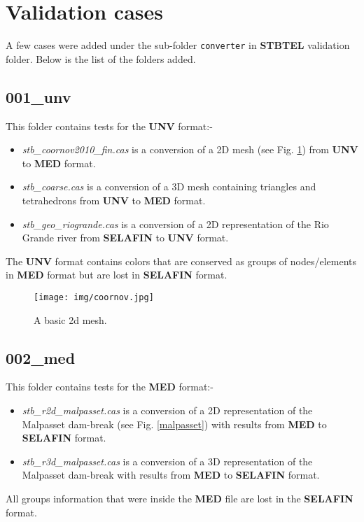 \documentclass[a4paper,10pt]{article}
\newcommand{\stb}{\textbf{STBTEL}\xspace}
\newcommand{\slf}{\textbf{SELAFIN}\xspace}
\newcommand{\unv}{\textbf{UNV}\xspace}
\newcommand{\med}{\textbf{MED}\xspace}
\begin{document}
\section{Validation cases}

A few cases were added under the sub-folder \verb+converter+ in \stb validation folder.
Below is the list of the folders added.

\subsection{001\_unv}

This folder contains tests for the \unv format:-
\begin{itemize}
\item \textit{stb\_coornov2010\_fin.cas} is a conversion of a 2D mesh (see Fig. \ref{coornov}) 
from \unv to \med format. 
\item \textit{stb\_coarse.cas} is a conversion of a 3D mesh containing triangles and tetrahedrons from
\unv to \med format.
\item \textit{stb\_geo\_riogrande.cas} is a conversion of a 2D representation of the Rio Grande river 
from \slf to \unv format.
\end{itemize}
The \unv format contains colors that are conserved as groups of nodes/elements 
in \med format but are lost in \slf format.

\begin{figure}[ht]
  \centering
  \texttt{[image: img/coornov.jpg]}
  \caption{A basic 2d mesh.}
  \label{coornov}
\end{figure}

\subsection{002\_med}

This folder contains tests for the \med format:-
\begin{itemize}
\item \textit{stb\_r2d\_malpasset.cas} is a conversion of a 2D representation of the Malpasset dam-break (see Fig. \ref{malpasset}) with results 
from \med to \slf format.
\item \textit{stb\_r3d\_malpasset.cas} is a conversion of a 3D representation of the Malpasset dam-break with results 
from \med to \slf format.
\end{itemize}
All groups information that were inside the \med file are lost in the \slf format.
\end{document}

